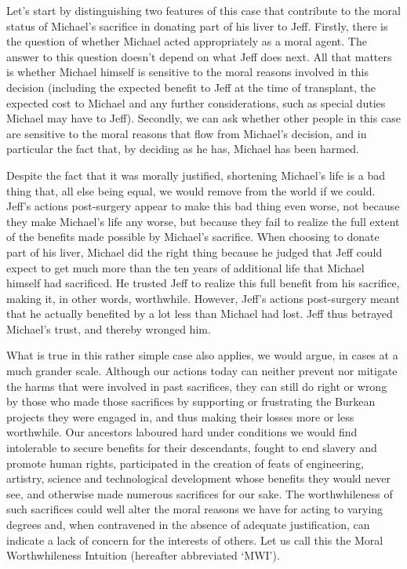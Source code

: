 \documentclass[man,11pt,a4paper]{apa7}
\begin{document}
Let's start by distinguishing two features of this case that contribute to the moral status of Michael's sacrifice in donating part of his liver to Jeff. Firstly, there is the question of whether Michael acted appropriately as a moral agent. The answer to this question doesn't depend on what Jeff does next. All that matters is whether Michael himself is sensitive to the moral reasons involved in this decision (including the expected benefit to Jeff at the time of transplant, the expected cost to Michael and any further considerations, such as special duties Michael may have to Jeff). Secondly, we can ask whether other people in this case are sensitive to the moral reasons that flow from Michael's decision, and in particular the fact that, by deciding as he has, Michael has been harmed.

Despite the fact that it was morally justified, shortening Michael's life is a bad thing that, all else being equal, we would remove from the world if we could. Jeff's actions post-surgery appear to make this bad thing even worse, not because they make Michael's life any worse, but because they fail to realize the full extent of the benefits made possible by Michael's sacrifice. When choosing to donate part of his liver, Michael did the right thing because he judged that Jeff could expect to get much more than the ten years of additional life that Michael himself had sacrificed. He trusted Jeff to realize this full benefit from his sacrifice, making it, in other words, worthwhile. However, Jeff's actions post-surgery meant that he actually benefited by a lot less than Michael had lost. Jeff thus betrayed Michael's trust, and thereby wronged him.

What is true in this rather simple case also applies, we would argue, in cases at a much grander scale. Although our actions today can neither prevent nor mitigate the harms that were involved in past sacrifices, they can still do right or wrong by those who made those sacrifices by supporting or frustrating the Burkean projects they were engaged in, and thus making their losses more or less worthwhile. Our ancestors laboured hard under conditions we would find intolerable to secure benefits for their descendants, fought to end slavery and promote human rights, participated in the creation of feats of engineering, artistry, science and technological development whose benefits they would never see, and otherwise made numerous sacrifices for our sake. The worthwhileness of such sacrifices could well alter the moral reasons we have for acting to varying degrees and, when contravened in the absence of adequate justification, can indicate a lack of concern for the interests of others. Let us call this the Moral Worthwhileness Intuition (hereafter abbreviated `MWI').
\end{document}
